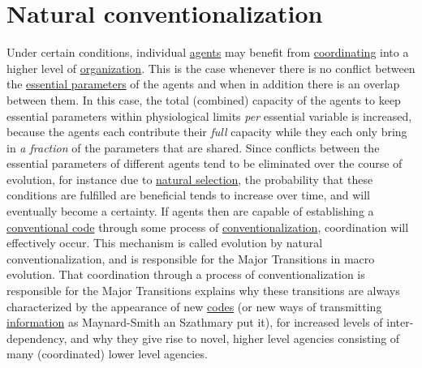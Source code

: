 \documentclass[12pt]{article}
\begin{document}
\hypertarget{natural_conventionalization}{}
\section{Natural conventionalization}

Under certain conditions, individual \hyperlink{agent}{agents} may benefit from
\hyperlink{coordination}{coordinating} into a higher level of
\hyperlink{organization}{organization}.  This is the case whenever
there is no conflict between the
\hyperlink{essential_parameters}{essential parameters} of the agents
and when in addition there is an overlap between them. In this case,
the total (combined) capacity of the agents to keep essential
parameters within physiological limits {\em per} essential variable is
increased, because the agents each contribute their {\em full}
capacity while they each only bring in {\em a fraction} of the
parameters that are shared. Since conflicts between the essential
parameters of different agents tend to be eliminated over the course
of evolution, for instance due to
\hyperlink{natural_selection}{natural selection}, the probability that
these conditions are fulfilled are beneficial tends to increase over
time, and will eventually become a certainty. If agents then are
capable of establishing a \hyperlink{convention}{conventional code}
through some process of
\hyperlink{conventionalization}{conventionalization}, coordination
will effectively occur.  This mechanism is called evolution by natural
conventionalization, and is responsible for the Major Transitions in
macro evolution. That coordination through a process of
conventionalization is responsible for the Major Transitions explains
why these transitions are always characterized by the appearance of
new \hyperlink{code}{codes} (or new ways of transmitting \hyperlink{information}{information} as Maynard-Smith an
Szathmary put it), for increased levels of inter-dependency, and why
they give rise to novel, higher level agencies consisting of many
(coordinated) lower level agencies.

\hypertarget{natural_conventions}{}
\end{document}
